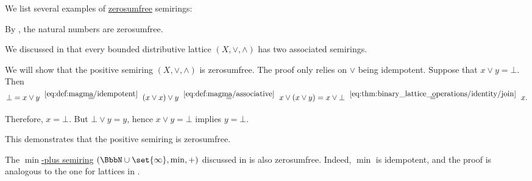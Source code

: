 \begin{example}\label{ex:def:zerosumfree}
  We list several examples of \hyperref[def:zerosumfree]{zerosumfree} semirings:
  \begin{thmenum}
     By , the natural numbers are zerosumfree.

     We discussed in  that every bounded distributive lattice \( (X, \vee, \wedge) \) has two associated semirings.

    We will show that the positive semiring \( (X, \vee, \wedge) \) is zerosumfree. The proof only relies on \( \vee \) being idempotent. Suppose that \( x \vee y = \bot \). Then
    \begin{equation*}
      \bot
      =
      x \vee y
      \reloset {\eqref{eq:def:magma/idempotent}} =
      (x \vee x) \vee y
      \reloset {\eqref{eq:def:magma/associative}} =
      x \vee (x \vee y)
      =
      x \vee \bot
      \reloset {\eqref{eq:thm:binary_lattice_operations/identity/join}} =
      x.
    \end{equation*}

    Therefore, \( x = \bot \). But \( \bot \vee y = y \), hence \( x \vee y = \bot \) implies \( y = \bot \).

    This demonstrates that the positive semiring is zerosumfree.

     The \hyperref[def:tropical_semiring]{\( \min \)-plus semiring} \( (\BbbN \cup \set{ \infty }, \min, +) \) discussed in  is also zerosumfree. Indeed, \( \min \) is idempotent, and the proof is analogous to the one for lattices in .
  \end{thmenum}
\end{example}
